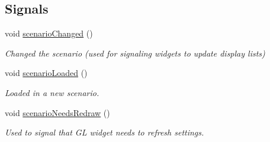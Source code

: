 \subsection*{Signals}
\begin{DoxyCompactItemize}
\item 
\mbox{\label{classrev_1_1_core_engine_a01c4d3e08f868b76a9e443ed2fe01f5f}} 
void \mbox{\hyperlink{classrev_1_1_core_engine_a01c4d3e08f868b76a9e443ed2fe01f5f}{scenario\+Changed}} ()
\begin{DoxyCompactList}\small\item\em Changed the scenario (used for signaling widgets to update display lists) \end{DoxyCompactList}\item 
\mbox{\label{classrev_1_1_core_engine_a5174d535ea421b9bd6ed579cfc5fc678}} 
void \mbox{\hyperlink{classrev_1_1_core_engine_a5174d535ea421b9bd6ed579cfc5fc678}{scenario\+Loaded}} ()
\begin{DoxyCompactList}\small\item\em Loaded in a new scenario. \end{DoxyCompactList}\item 
\mbox{\label{classrev_1_1_core_engine_a55e3d077d8201407c1e169c0cd470870}} 
void \mbox{\hyperlink{classrev_1_1_core_engine_a55e3d077d8201407c1e169c0cd470870}{scenario\+Needs\+Redraw}} ()
\begin{DoxyCompactList}\small\item\em Used to signal that GL widget needs to refresh settings. \end{DoxyCompactList}\end{DoxyCompactItemize}

